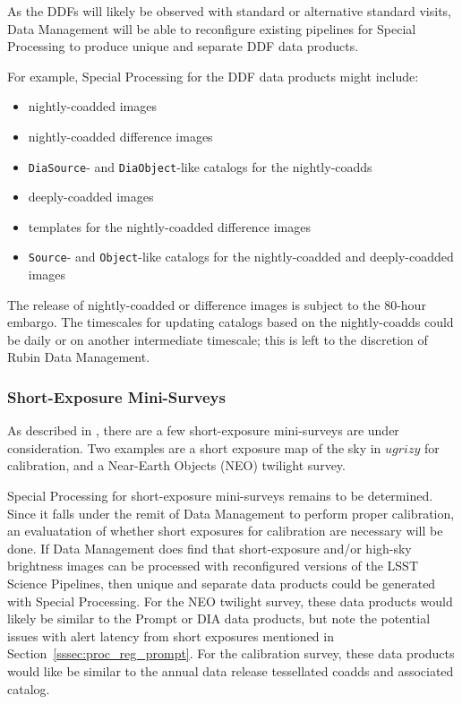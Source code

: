 As the DDFs will likely be observed with standard or alternative standard 
visits, Data Management will be able to reconfigure existing pipelines for
Special Processing to produce unique and separate DDF data products.

For example, Special Processing for the DDF data products might include:
\begin{itemize}
\item nightly-coadded images
\item nightly-coadded difference images
\item {\tt DiaSource}- and {\tt DiaObject}-like catalogs for the nightly-coadds
\item deeply-coadded images
\item templates for the nightly-coadded difference images
\item {\tt Source}- and {\tt Object}-like catalogs for the nightly-coadded and deeply-coadded images
\end{itemize}

The release of nightly-coadded or difference images is subject to the 80-hour embargo.
The timescales for updating catalogs based on the nightly-coadds could be daily
or on another intermediate timescale; this is left to the discretion of Rubin Data Management.


\subsubsection{Short-Exposure Mini-Surveys}

As described in , there are a few
short-exposure mini-surveys are under consideration.
Two examples are a short exposure map of the sky in $ugrizy$ for calibration,
and a Near-Earth Objects (NEO) twilight survey.

Special Processing for short-exposure mini-surveys remains to
be determined.
Since it falls under the remit of Data Management to perform proper calibration,
an evaluatation of whether short exposures for calibration are necessary
will be done. 
If Data Management does find that short-exposure and/or high-sky brightness images
can be processed with reconfigured versions of the LSST Science Pipelines,
then unique and separate data products could be generated with Special Processing.
For the NEO twilight survey, these data products would likely be similar to the
Prompt or DIA data products, but note the potential issues with alert
latency from short exposures mentioned in Section~\ref{sssec:proc_reg_prompt}.
For the calibration survey, these data products would like be similar to the
annual data release tessellated coadds and associated catalog.

